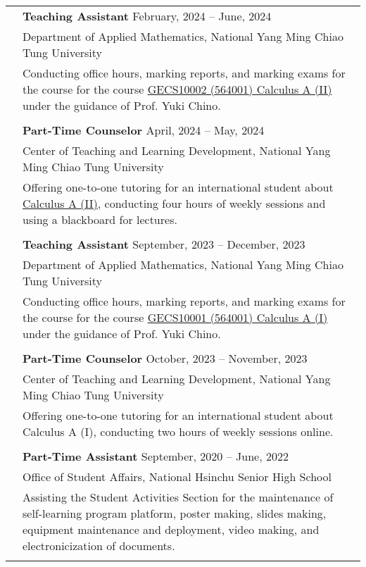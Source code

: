 \documentclass[letterpaper, 11pt]{article}
\begin{document}
\begin{center}
\begin{longtable}{p{0.74in}p{5.95in}}
        & \textbf{Teaching Assistant}  \hfill February, 2024 -- June, 2024 \\
         
        & Department of Applied Mathematics, National Yang Ming Chiao Tung University\\
        & Conducting office hours, marking reports, and marking exams for the course for the course \href{https://reurl.cc/RqoMez}{GECS10002 (564001) Calculus A (II)} under the guidance of Prof. Yuki Chino. \\
        & \\
        
        & \textbf{Part-Time Counselor} \hfill April, 2024 -- May, 2024 \\
        & Center of Teaching and Learning Development, National Yang Ming Chiao Tung University\\
        & Offering one-to-one tutoring for an international student about \href{https://github.com/eiken59/2024_II_Tutor}{Calculus A (II)}, conducting four hours of weekly sessions and using a blackboard for lectures.\\
        & \\

        & \textbf{Teaching Assistant} \hfill September, 2023 -- December, 2023 \\
        & Department of Applied Mathematics, National Yang Ming Chiao Tung University\\
        & Conducting office hours, marking reports, and marking exams for the course for the course \href{https://reurl.cc/Djp5jN}{GECS10001 (564001) Calculus A (I)} under the guidance of Prof. Yuki Chino.\\
        & \\

        & \textbf{Part-Time Counselor} \hfill October, 2023 -- November, 2023 \\
        & Center of Teaching and Learning Development, National Yang Ming Chiao Tung University\\
        & Offering one-to-one tutoring for an international student about Calculus A (I), conducting two hours of weekly sessions online.\\
        & \\
        
        & \textbf{Part-Time Assistant} \hfill September, 2020 -- June, 2022 \\
        & Office of Student Affairs, National Hsinchu Senior High School\\
        & Assisting the Student Activities Section for the maintenance of self-learning program platform, poster making, slides making, equipment maintenance and deployment, video making, and electronicization of documents.\\
        & \\


\end{longtable}
\end{center}
\end{document}
